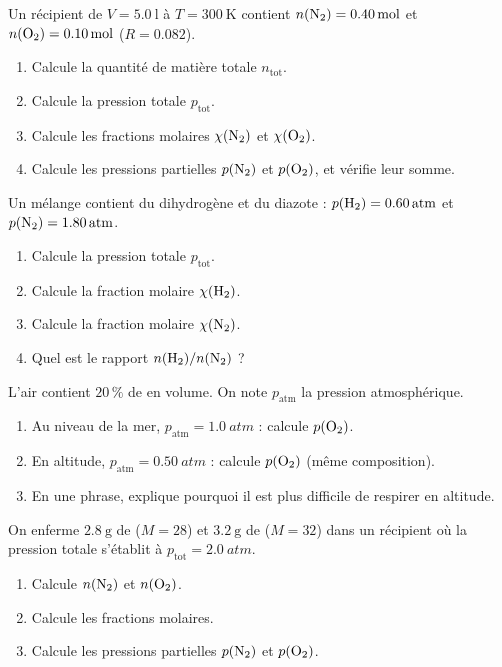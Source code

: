 \documentclass[11pt,a4paper]{article}
\begin{document}
\begin{exo}
Un récipient de $V=\qty{5.0}{\litre}$ à $T=\qty{300}{\kelvin}$ contient $n(\ce{N2})=\qty{0.40}{\mole}$ et
$n(\ce{O2})=\qty{0.10}{\mole}$ ($R=\num{0,082}$).
\begin{enumerate}[label=\alph*)]
  \item Calcule la quantité de matière totale $n_{\text{tot}}$.
  \item Calcule la pression totale $p_{\text{tot}}$.
  \item Calcule les fractions molaires $\chi(\ce{N2})$ et $\chi(\ce{O2})$.
  \item Calcule les pressions partielles $p(\ce{N2})$ et $p(\ce{O2})$, et vérifie leur somme.
\end{enumerate}
\end{exo}

\begin{exo}
Un mélange contient du dihydrogène et du diazote : $p(\ce{H2})=\qty{0.60}{atm}$ et
$p(\ce{N2})=\qty{1.80}{atm}$.
\begin{enumerate}[label=\alph*)]
  \item Calcule la pression totale $p_{\text{tot}}$.
  \item Calcule la fraction molaire $\chi(\ce{H2})$.
  \item Calcule la fraction molaire $\chi(\ce{N2})$.
  \item Quel est le rapport $n(\ce{H2})/n(\ce{N2})$ ?
\end{enumerate}
\end{exo}

\begin{exo}
L'air contient $20\,\%$ de  en volume. On note $p_{\text{atm}}$ la pression atmosphérique.
\begin{enumerate}[label=\alph*)]
  \item Au niveau de la mer, $p_{\text{atm}}=\qty{1.0}{atm}$ : calcule $p(\ce{O2})$.
  \item En altitude, $p_{\text{atm}}=\qty{0.50}{atm}$ : calcule $p(\ce{O2})$ (même composition).
  \item En une phrase, explique pourquoi il est plus difficile de respirer en altitude.
\end{enumerate}
\end{exo}

\begin{exo}
On enferme $\qty{2.8}{\gram}$ de  ($M=28$) et $\qty{3.2}{\gram}$ de  ($M=32$) dans un
récipient où la pression totale s'établit à $p_{\text{tot}}=\qty{2.0}{atm}$.
\begin{enumerate}[label=\alph*)]
  \item Calcule $n(\ce{N2})$ et $n(\ce{O2})$.
  \item Calcule les fractions molaires.
  \item Calcule les pressions partielles $p(\ce{N2})$ et $p(\ce{O2})$.
\end{enumerate}
\end{exo}
\end{document}
